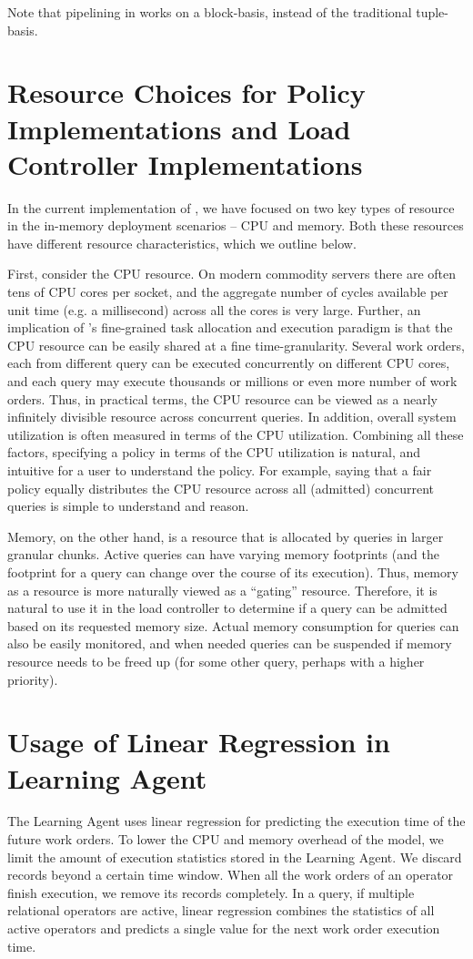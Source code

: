 Note that pipelining in \sys{} works on a block-basis, instead of the traditional tuple-basis.

\section{Resource Choices for Policy Implementations and Load Controller Implementations}\label{apx:resource-discussion}
In the current implementation of \sys{}, we have focused on two key types of resource in the in-memory deployment scenarios -- CPU and memory. 
Both these resources have different resource characteristics, which we outline below.

First, consider the CPU resource. 
On modern commodity servers there are often tens of CPU cores per socket, and the aggregate number of cycles available per unit time (e.g. a millisecond) across all the cores is very large. 
Further, an implication of \sys{}'s fine-grained task allocation and execution paradigm is that the CPU resource can be easily shared at a fine time-granularity. 
Several work orders, each from different query can be executed concurrently on different CPU cores, and each query may execute thousands or millions or even more number of work orders. 
Thus, in practical terms, the CPU resource can be viewed as a nearly infinitely divisible resource across concurrent queries. 
In addition, overall system utilization is often measured in terms of the CPU utilization. Combining all these factors, specifying a policy  in terms of the CPU utilization is natural, and intuitive for a user to understand the policy. 
For example, saying that a fair policy equally distributes the CPU resource across all (admitted) concurrent queries is simple to understand and reason. 

Memory, on the other hand, is a resource that is allocated by queries in larger granular chunks. 
Active queries can have varying memory footprints (and the footprint for a query can change over the course of its execution). 
Thus, memory as a resource is more naturally viewed as a ``gating'' resource. 
Therefore, it is natural to use it in the load controller to determine if a query can be admitted based on its requested memory size. 
Actual memory consumption for queries can also be easily monitored, and when needed queries can be suspended if memory resource needs to be freed up (for some other query, perhaps with a higher priority). 

\section{Usage of Linear Regression in Learning Agent}\label{apx:linear-regression-usage}
The Learning Agent uses linear regression for predicting the execution time of the future work orders.
To lower the CPU and memory overhead of the model, we limit the amount of execution statistics stored in the Learning Agent.
We discard records beyond a certain time window. 
When all the work orders of an operator finish execution, we remove its records completely. 
In a query, if multiple relational operators are active, linear regression combines the statistics of all active operators and predicts a single value for the next work order execution time.

